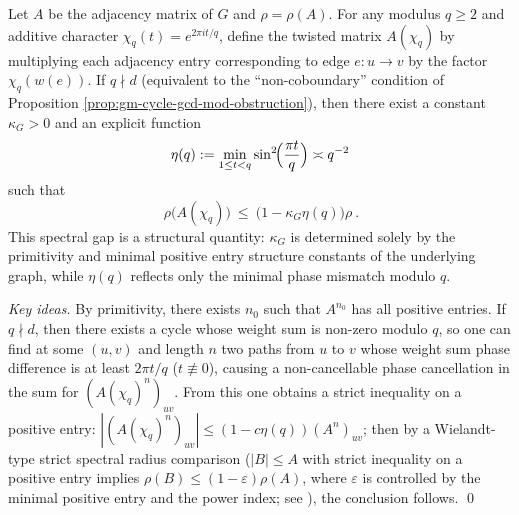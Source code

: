 \begin{theorem}\label{thm:gm-uniform-twist-gap-from-gcd}
Let \(A\) be the adjacency matrix of \(G\) and \(\rho=\rho(A)\).
For any modulus \(q\ge 2\) and additive character \(\chi_q(t)=e^{2\pi i t/q}\), define the twisted matrix \(A(\chi_q)\) by multiplying each adjacency entry corresponding to edge \(e:u\to v\) by the factor \(\chi_q(w(e))\).
If \(q\nmid d\) (equivalent to the ``non-coboundary'' condition of Proposition \ref{prop:gm-cycle-gcd-mod-obstruction}), then there exist a constant \(\kappa_G>0\) and an explicit function
\[
\eta(q):=\min_{1\le t<q}\sin^2\!\Bigl(\frac{\pi t}{q}\Bigr)\asymp q^{-2}
\]
such that
\[
\boxed{\ \rho\!\bigl(A(\chi_q)\bigr)\ \le\ \bigl(1-\kappa_G\eta(q)\bigr)\rho\ }.
\]
This spectral gap is a structural quantity: \(\kappa_G\) is determined solely by the primitivity and minimal positive entry structure constants of the underlying graph, while \(\eta(q)\) reflects only the minimal phase mismatch modulo \(q\).
\end{theorem}

\begin{proof}[Key ideas]
By primitivity, there exists \(n_0\) such that \(A^{n_0}\) has all positive entries.
If \(q\nmid d\), then there exists a cycle whose weight sum is non-zero modulo \(q\), so one can find at some \((u,v)\) and length \(n\) two paths from \(u\) to \(v\) whose weight sum phase difference is at least \(2\pi t/q\) (\(t\not\equiv 0\)), causing a non-cancellable phase cancellation in the sum for \((A(\chi_q)^n)_{uv}\).
From this one obtains a strict inequality on a positive entry:
\(
|(A(\chi_q)^n)_{uv}|\le (1-c\eta(q))(A^n)_{uv}
\);
then by a Wielandt-type strict spectral radius comparison (\(|B|\le A\) with strict inequality on a positive entry implies \(\rho(B)\le (1-\varepsilon)\rho(A)\), where \(\varepsilon\) is controlled by the minimal positive entry and the power index; see \cite{Wielandt1950UnzerlegbareNichtnegative}), the conclusion follows. \qed
\end{proof}

